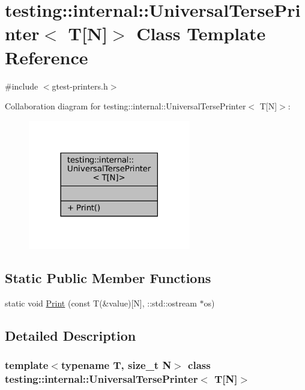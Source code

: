 \hypertarget{classtesting_1_1internal_1_1UniversalTersePrinter_3_01T[N]_4}{}\section{testing\+:\+:internal\+:\+:Universal\+Terse\+Printer$<$ T\mbox{[}N\mbox{]}$>$ Class Template Reference}
\label{classtesting_1_1internal_1_1UniversalTersePrinter_3_01T[N]_4}


{\ttfamily \#include $<$gtest-\/printers.\+h$>$}



Collaboration diagram for testing\+:\+:internal\+:\+:Universal\+Terse\+Printer$<$ T\mbox{[}N\mbox{]}$>$\+:
\nopagebreak
\begin{figure}[H]
\begin{center}
\leavevmode
\includegraphics[width=201pt]{classtesting_1_1internal_1_1UniversalTersePrinter_3_01T[N]_4__coll__graph}
\end{center}
\end{figure}
\subsection*{Static Public Member Functions}
\begin{DoxyCompactItemize}
\item 
static void \hyperlink{classtesting_1_1internal_1_1UniversalTersePrinter_3_01T[N]_4_a9e0ceb62fda7dc46ebcf5f911e459a49}{Print} (const T(\&value)\mbox{[}N\mbox{]}, \+::std\+::ostream $\ast$os)
\end{DoxyCompactItemize}


\subsection{Detailed Description}
\subsubsection*{template$<$typename T, size\+\_\+t N$>$\newline
class testing\+::internal\+::\+Universal\+Terse\+Printer$<$ T\mbox{[}\+N\mbox{]}$>$}



